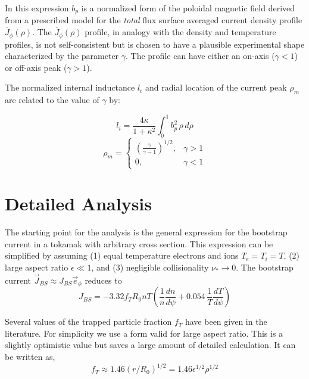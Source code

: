 In this expression $b_p$ is a normalized form of the poloidal magnetic field derived from a prescribed model for the \emph{total} flux surface averaged current density profile $\overline J_\phi(\rho)$. The $\overline J_\phi(\rho)$ profile, in analogy with the density and temperature profiles, is not self-consistent but is chosen to have a plausible experimental shape characterized by the parameter $\gamma$. The profile can have either an on-axis ($\gamma < 1$) or off-axis peak ($\gamma > 1 $).

The normalized internal inductance $l_i$ and radial location of the current peak $\rho_m$ are related to the value of $\gamma$ by:

\begin{equation}
	l_i = \frac{ 4 \kappa }{ 1 + \kappa^2 } \int_0^1 b_p^2 \, \rho \, d\rho
\end{equation}
\begin{equation}
	\rho_m = 
\begin{cases}
   \left( \frac{\gamma}{\gamma - 1} \right)^{1/2},& \gamma > 1 \\
    0,              & \gamma < 1
\end{cases}
\end{equation}

\section{Detailed Analysis}

The starting point for the analysis is the general expression for the bootstrap current in a tokamak with arbitrary cross section.\cite{wesson,sauter} This expression can be simplified by assuming (1) equal temperature electrons and ions $T_e = T_i = T$, (2) large aspect ratio $\epsilon \ll 1$, and (3) negligible collisionality $\nu_* \rightarrow 0$. The bootstrap current $\vec J_{BS} \approx J_{BS} \vec e_\phi$ reduces to
\begin{equation}
	J_{BS} = -3.32 f_T R_0 n T \left( \frac{1}{n} \frac{dn}{d\psi} + 0.054 \, \frac{1}{T} \frac{dT}{d\psi} \right)
\end{equation}

Several values of the trapped particle fraction $f_T$ have been given in the literature.\cite{kessel_bootstrap} For simplicity we use a form valid for large aspect ratio. This is a slightly optimistic value but saves a large amount of detailed calculation. It can be written as,
\begin{equation}
	f_T \approx 1.46 ( r / R_0 )^{1/2} = 1.46 \epsilon^{1/2} \rho^{1/2}
\end{equation}

